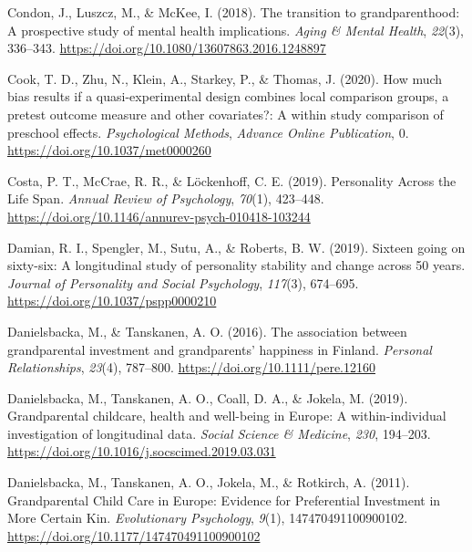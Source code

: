 \documentclass[
  english,
  man, noextraspace]{apa7}
\begin{document}
\leavevmode\hypertarget{ref-condonTransitionGrandparenthoodProspective2018}{}%
Condon, J., Luszcz, M., \& McKee, I. (2018). The transition to grandparenthood: A prospective study of mental health implications. \emph{Aging \& Mental Health}, \emph{22}(3), 336--343. \url{https://doi.org/10.1080/13607863.2016.1248897}

\leavevmode\hypertarget{ref-cookHowMuchBias2020}{}%
Cook, T. D., Zhu, N., Klein, A., Starkey, P., \& Thomas, J. (2020). How much bias results if a quasi-experimental design combines local comparison groups, a pretest outcome measure and other covariates?: A within study comparison of preschool effects. \emph{Psychological Methods}, \emph{Advance Online Publication}, 0. \url{https://doi.org/10.1037/met0000260}

\leavevmode\hypertarget{ref-costaPersonalityLifeSpan2019}{}%
Costa, P. T., McCrae, R. R., \& Löckenhoff, C. E. (2019). Personality Across the Life Span. \emph{Annual Review of Psychology}, \emph{70}(1), 423--448. \url{https://doi.org/10.1146/annurev-psych-010418-103244}

\leavevmode\hypertarget{ref-damianSixteenGoingSixtysix2019}{}%
Damian, R. I., Spengler, M., Sutu, A., \& Roberts, B. W. (2019). Sixteen going on sixty-six: A longitudinal study of personality stability and change across 50 years. \emph{Journal of Personality and Social Psychology}, \emph{117}(3), 674--695. \url{https://doi.org/10.1037/pspp0000210}

\leavevmode\hypertarget{ref-danielsbackaAssociationGrandparentalInvestment2016}{}%
Danielsbacka, M., \& Tanskanen, A. O. (2016). The association between grandparental investment and grandparents' happiness in Finland. \emph{Personal Relationships}, \emph{23}(4), 787--800. \url{https://doi.org/10.1111/pere.12160}

\leavevmode\hypertarget{ref-danielsbackaGrandparentalChildcareHealth2019}{}%
Danielsbacka, M., Tanskanen, A. O., Coall, D. A., \& Jokela, M. (2019). Grandparental childcare, health and well-being in Europe: A within-individual investigation of longitudinal data. \emph{Social Science \& Medicine}, \emph{230}, 194--203. \url{https://doi.org/10.1016/j.socscimed.2019.03.031}

\leavevmode\hypertarget{ref-danielsbackaGrandparentalChildCare2011}{}%
Danielsbacka, M., Tanskanen, A. O., Jokela, M., \& Rotkirch, A. (2011). Grandparental Child Care in Europe: Evidence for Preferential Investment in More Certain Kin. \emph{Evolutionary Psychology}, \emph{9}(1), 147470491100900102. \url{https://doi.org/10.1177/147470491100900102}
\end{document}

